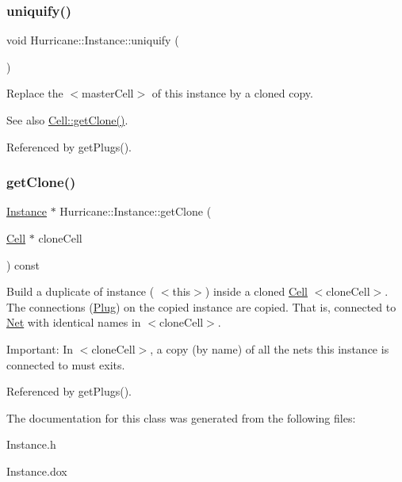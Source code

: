 \subsubsection{\texorpdfstring{uniquify()}{uniquify()}}
{\footnotesize\ttfamily void Hurricane\+::\+Instance\+::uniquify (\begin{DoxyParamCaption}{ }\end{DoxyParamCaption})}

Replace the {\ttfamily } $<$master\+Cell$>$ of this instance by a cloned copy.

\begin{DoxySeeAlso}{See also}
\hyperlink{classHurricane_1_1Cell_a092f53c7f517ecc70d9ba375296c5d5b}{Cell\+::get\+Clone()}. 
\end{DoxySeeAlso}


Referenced by get\+Plugs().

\mbox{\label{classHurricane_1_1Instance_ac5e111eef5767762e00f21fcd7a35702}} 
\subsubsection{\texorpdfstring{get\+Clone()}{getClone()}}
{\footnotesize\ttfamily \hyperlink{classHurricane_1_1Instance}{Instance} $\ast$ Hurricane\+::\+Instance\+::get\+Clone (\begin{DoxyParamCaption}\item[{\hyperlink{classHurricane_1_1Cell}{Cell} $\ast$}]{clone\+Cell }\end{DoxyParamCaption}) const}

Build a duplicate of instance ({\ttfamily } $<$this$>$) inside a cloned \hyperlink{classHurricane_1_1Cell}{Cell} {\ttfamily } $<$clone\+Cell$>$. The connections (\hyperlink{classHurricane_1_1Plug}{Plug}) on the copied instance are copied. That is, connected to \hyperlink{classHurricane_1_1Net}{Net} with identical names in {\ttfamily } $<$clone\+Cell$>$.

\begin{DoxyParagraph}{Important\+:}
In {\ttfamily } $<$clone\+Cell$>$, a copy (by name) of all the nets this instance is connected to must exits. 
\end{DoxyParagraph}


Referenced by get\+Plugs().



The documentation for this class was generated from the following files\+:\begin{DoxyCompactItemize}
\item 
Instance.\+h\item 
Instance.\+dox\end{DoxyCompactItemize}
